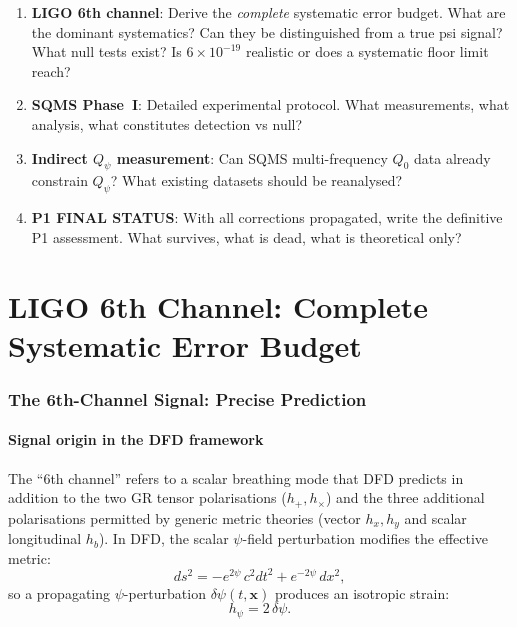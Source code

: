 \documentclass[11pt]{article}
\newcommand{\ee}[1]{\times 10^{#1}}
\newcommand{\Qpsi}{Q_\psi}
\theoremstyle{definition}
\theoremstyle{remark}
\begin{document}
\begin{tcolorbox}[colback=blue!5!white, colframe=blue!60!black,
  title=\textbf{W3i7 MANDATE}]
\begin{enumerate}[nosep,label=\textbf{M\arabic*.}]
\item \textbf{LIGO 6th channel}: Derive the \emph{complete} systematic
  error budget. What are the dominant systematics? Can they be
  distinguished from a true psi signal? What null tests exist?
  Is $6\ee{-19}$ realistic or does a systematic floor limit reach?
\item \textbf{SQMS Phase~I}: Detailed experimental protocol. What
  measurements, what analysis, what constitutes detection vs null?
\item \textbf{Indirect $\Qpsi$ measurement}: Can SQMS multi-frequency
  $Q_0$ data already constrain $\Qpsi$? What existing datasets should
  be reanalysed?
\item \textbf{P1 FINAL STATUS}: With all corrections propagated, write
  the definitive P1 assessment. What survives, what is dead, what is
  theoretical only?
\end{enumerate}
\end{tcolorbox}


\part{LIGO 6th Channel: Complete Systematic Error Budget}
\label{part:LIGO}

\section{The 6th-Channel Signal: Precise Prediction}
\label{sec:ligo_signal}

\subsection{Signal origin in the DFD framework}

The ``6th channel'' refers to a scalar breathing mode that DFD predicts
in addition to the two GR tensor polarisations ($h_+, h_\times$) and the
three additional polarisations permitted by generic metric theories (vector
$h_x, h_y$ and scalar longitudinal $h_b$). In DFD, the scalar $\psi$-field
perturbation modifies the effective metric:
\begin{equation}
ds^2 = -e^{2\psi}\,c^2 dt^2 + e^{-2\psi}\,dx^2,
\label{eq:DFD_metric}
\end{equation}
so a propagating $\psi$-perturbation $\delta\psi(t,\mathbf{x})$ produces
an isotropic strain:
\begin{equation}
h_\psi = 2\,\delta\psi.
\label{eq:h_psi}
\end{equation}
\end{document}
